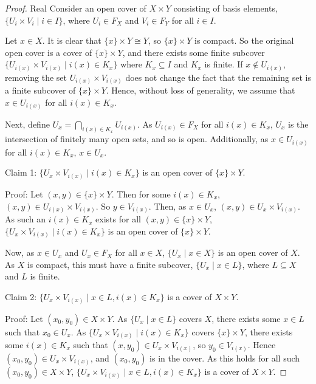 \begin{proof}{Real}
	Consider an open cover of $X \times Y$ consisting of basis elements, $\{U_i \times V_i \mid i \in I\}$, where $U_i \in F_X$ and $V_i \in F_Y$ for all $i \in I$.
	
	Let $x \in X$. It is clear that $\{x\} \times Y \cong Y$, so $\{x\} \times Y$ is compact. So the original open cover is a cover of $\{x\} \times Y$, and there exists some finite subcover $\{U_{i(x)} \times V_{i(x)} \mid i(x) \in K_x\}$ where $K_x \subseteq I$ and $K_x$ is finite. If $x \notin U_{i(x)}$, removing the set $U_{i(x)} \times V_{i(x)}$ does not change the fact that the remaining set is a finite subcover of $\{x\} \times Y$. Hence, without loss of generality, we assume that $x \in U_{i(x)}$ for all $i(x) \in K_x$.
	
	Next, define $\displaystyle{U_x = \bigcap_{i(x) \in K_x} U_{i(x)}}$. As $U_{i(x)} \in F_X$ for all $i(x) \in K_x$, $U_x$ is the intersection of finitely many open sets, and so is open. Additionally, as $x \in U_{i(x)}$ for all $i(x) \in K_x$, $x \in U_x$.
	
	Claim 1: $\{U_x \times V_{i(x)} \mid i(x) \in K_x\}$ is an open cover of $\{x\} \times Y$.
	
	Proof: Let $(x,y) \in \{x\} \times Y$. Then for some $i(x) \in K_x$, $(x,y) \in U_{i(x)} \times V_{i(x)}$. So $y \in V_{i(x)}$. Then, as $x \in U_x$, $(x,y) \in U_x \times V_{i(x)}$. As such an $i(x) \in K_x$ exists for all $(x,y) \in \{x\} \times Y$, $\{U_x \times V_{i(x)} \mid i(x) \in K_x\}$ is an open cover of $\{x\} \times Y$.
	
	Now, as $x \in U_x$ and $U_x \in F_X$ for all $x \in X$, $\{U_x \mid x \in X\}$ is an open cover of $X$. As $X$ is compact, this must have a finite subcover, $\{U_x \mid x \in L\}$, where $L \subseteq X$ and $L$ is finite.
	
	Claim 2: $\{U_x \times V_{i(x)} \mid x \in L, i(x) \in K_x\}$ is a cover of $X \times Y$.
	
	Proof: Let $(x_0,y_0) \in X \times Y$. As $\{U_x \mid x \in L\}$ covers $X$, there exists some $x \in L$ such that $x_0 \in U_x$. As $\{U_x \times V_{i(x)} \mid i(x) \in K_x\}$ covers $\{x\} \times Y$, there exists some $i(x) \in K_x$ such that $(x,y_0) \in U_x \times V_{i(x)}$, so $y_0 \in V_{i(x)}$. Hence $(x_0, y_0) \in U_x \times V_{i(x)}$, and $(x_0,y_0)$ is in the cover. As this holds for all such $(x_0,y_0) \in X \times Y$, $\{U_x \times V_{i(x)} \mid x \in L, i(x) \in K_x\}$ is a cover of $X \times Y$.
	

\end{proof}
